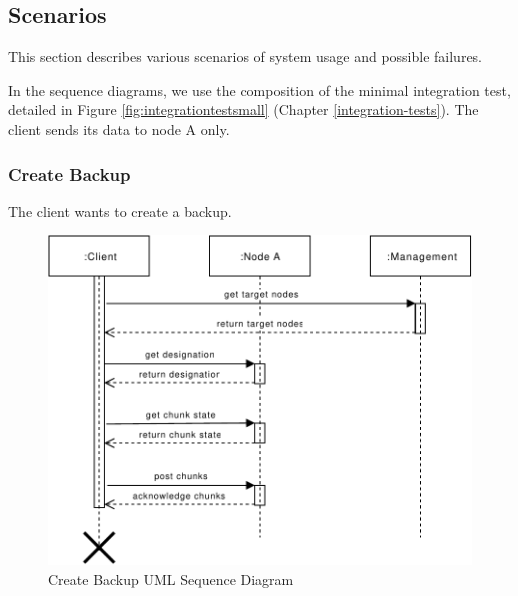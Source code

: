 \subsection{Scenarios}
\label{sec:scenarios}
This section describes various scenarios of \gls{system} usage and possible failures.

In the sequence diagrams, we use the composition of the minimal integration test, detailed in Figure \ref{fig:integrationtestsmall} (Chapter \ref{integration-tests}).
The \gls{client} sends its data to \Gls{node} A only.

\subsubsection{Create Backup}\label{sec:scenario-create-backup}
The \gls{client} wants to create a backup.

\begin{figure}[h]
    \centering
    \includegraphics[width=\linewidth]{resources/create_backup}
    \caption{Create Backup UML Sequence Diagram}
    \label{fig:create-backup}
\end{figure}

